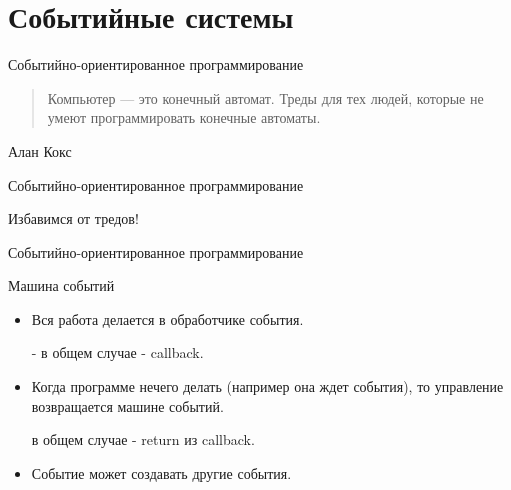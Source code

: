 \documentclass[aspectratio=169]{beamer}
\begin{document}
\section{Событийные системы}

\begin{frame}{Событийно-ориентированное программирование}

    \begin{quote}
    Компьютер — это конечный автомат.
        Треды для тех людей, которые не умеют
        программировать конечные автоматы.
    \end{quote}
    \begin{center}
        \begin{uncoverenv}
        Алан Кокс
        \end{uncoverenv}
    \end{center}

\end{frame}

\begin{frame}{Событийно-ориентированное программирование}
    \begin{block}
        {\huge Избавимся от тредов!}
    \end{block}
\end{frame}

\begin{frame}{Событийно-ориентированное программирование}
    \begin{block}{Машина событий}
        \begin{itemize}

            \pause\item Вся работа делается в обработчике события.
                \pause\par - в общем случае - callback.

            \pause\item Когда программе нечего делать (например
                она ждет события), то управление возвращается
                машине событий.
                    \pause\par в общем случае - return из callback.

            \pause\item Событие может создавать другие события.
        \end{itemize}
    \end{block}
\end{frame}
\end{document}
